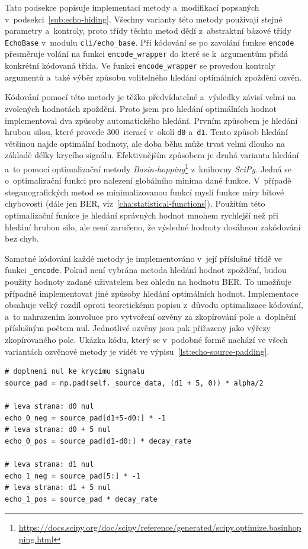 Tato podsekce popisuje implementaci metody a~modifikací popsaných
v~podsekci~\ref{sub:echo-hiding}. Všechny varianty této metody používají stejné
parametry a~kontroly, proto třídy těchto metod dědí z~abstraktní bázové třídy
\texttt{EchoBase} v~modulu \texttt{cli/echo\_base}. Při kódování se po zavolání
funkce \texttt{encode} přesměruje volání na funkci \texttt{encode\_wrapper} do
které se k~argumentům přidá konkrétní kódovaná třída. Ve funkci
\texttt{encode\_wrapper} se provedou kontroly argumentů a~také výběr způsobu
volitelného hledání optimálních zpoždění ozvěn.

Kódování pomocí této metody je těžko předvídatelné a~výsledky závisí velmi na
zvolených hodnotách zpoždění. Proto jsem pro hledání optimálních hodnot
implementoval dva způsoby automatického hledání. Prvním způsobem je hledání
hrubou silou, které provede 300~iterací v~okolí \texttt{d0} a~\texttt{d1}.
Tento způsob hledání většinou najde optimální hodnoty, ale doba běhu může trvat
velmi dlouho na základě délky krycího signálu. Efektivnějším způsobem je druhá
varianta hledání a~to pomocí optimalizační metody
\textit{Basin-hopping}\footnote{\url{https://docs.scipy.org/doc/scipy/reference/generated/scipy.optimize.basinhopping.html}}
z~knihovny \textit{SciPy}. Jedná se o~optimalizační funkci pro nalezení
globálního minima dané funkce. V~případě steganografických metod se
minimalizovanou funkcí myslí funkce míry bitové chybovosti (dále jen BER,
viz~\ref{cha:statistical-functions}). Použitím této optimalizační funkce je
hledání správných hodnot mnohem rychlejší než při hledání hrubou silo, ale není
zaručeno, že výsledné hodnoty dosáhnou zakódování bez chyb.

Samotné kódování každé metody je implementováno v~její příslušné třídě ve
funkci \texttt{\_encode}. Pokud není vybrána metoda hledání hodnot zpoždění,
budou použity hodnoty zadané uživatelem bez ohledu na hodnotu BER. To umožňuje
případně implementovat jiné způsoby hledání optimálních hodnot. Implementace
obsahuje velký rozdíl oproti teoretickému popisu z~důvodu optimalizace
kódování, a~to nahrazením konvoluce pro vytvoření ozvěny za zkopírování pole
a~doplnění příslušným počtem nul. Jednotlivé ozvěny jsou pak přiřazeny jako
výřezy zkopírovaného pole. Ukázka kódu, který se v~podobné formě nachází ve
všech variantách ozvěnové metody je vidět ve
výpisu~\ref{lst:echo-source-padding}.

\begin{lstlisting}[language=PythonPlus, label={lst:echo-source-padding},
caption={Vytvoření pouze jedné kopie krycího signálu a~přiřazení jednotlivých
ozvěn jako výřezy.}]
# doplneni nul ke krycimu signalu
source_pad = np.pad(self._source_data, (d1 + 5, 0)) * alpha/2

# leva strana: d0 nul
echo_0_neg = source_pad[d1+5-d0:] * -1
# leva strana: d0 + 5 nul
echo_0_pos = source_pad[d1-d0:] * decay_rate

# leva strana: d1 nul
echo_1_neg = source_pad[5:] * -1
# leva strana: d1 + 5 nul
echo_1_pos = source_pad * decay_rate
\end{lstlisting}

